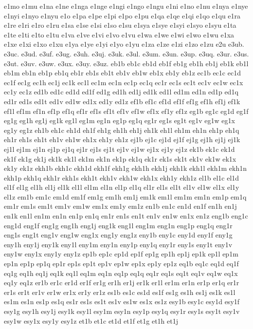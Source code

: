 {e1mo
e1mu
e1na
e1ne
e1nga
e1nge
e1ngi
e1ngo
e1ngu
e1ni
e1no
e1nu
e1nya
e1nye
e1nyi
e1nyo
e1nyu
e1o
e1pa
e1pe
e1pi
e1po
e1pu
e1qa
e1qe
e1qi
e1qo
e1qu
e1ra
e1re
e1ri
e1ro
e1ru
e1sa
e1se
e1si
e1so
e1su
e1sya
e1sye
e1syi
e1syo
e1syu
e1ta
e1te
e1ti
e1to
e1tu
e1va
e1ve
e1vi
e1vo
e1vu
e1wa
e1we
e1wi
e1wo
e1wu
e1xa
e1xe
e1xi
e1xo
e1xu
e1ya
e1ye
e1yi
e1yo
e1yu
e1za
e1ze
e1zi
e1zo
e1zu
e2u
e3ub.
e3uc.
e3ud.
e3uf.
e3ug.
e3uh.
e3uj.
e3uk.
e3ul.
e3um.
e3un.
e3up.
e3uq.
e3ur.
e3us.
e3ut.
e3uv.
e3uw.
e3ux.
e3uy.
e3uz.
eb1b
eb1c
eb1d
eb1f
eb1g
eb1h
eb1j
eb1k
eb1l
eb1m
eb1n
eb1p
eb1q
eb1r
eb1s
eb1t
eb1v
eb1w
eb1x
eb1y
eb1z
ec1b
ec1c
ec1d
ec1f
ec1g
ec1h
ec1j
ec1k
ec1l
ec1m
ec1n
ec1p
ec1q
ec1r
ec1s
ec1t
ec1v
ec1w
ec1x
ec1y
ec1z
ed1b
ed1c
ed1d
ed1f
ed1g
ed1h
ed1j
ed1k
ed1l
ed1m
ed1n
ed1p
ed1q
ed1r
ed1s
ed1t
ed1v
ed1w
ed1x
ed1y
ed1z
ef1b
ef1c
ef1d
ef1f
ef1g
ef1h
ef1j
ef1k
ef1l
ef1m
ef1n
ef1p
ef1q
ef1r
ef1s
ef1t
ef1v
ef1w
ef1x
ef1y
ef1z
eg1b
eg1c
eg1d
eg1f
eg1g
eg1h
eg1j
eg1k
eg1l
eg1m
eg1n
eg1p
eg1q
eg1r
eg1s
eg1t
eg1v
eg1w
eg1x
eg1y
eg1z
eh1b
eh1c
eh1d
eh1f
eh1g
eh1h
eh1j
eh1k
eh1l
eh1m
eh1n
eh1p
eh1q
eh1r
eh1s
eh1t
eh1v
eh1w
eh1x
eh1y
eh1z
ej1b
ej1c
ej1d
ej1f
ej1g
ej1h
ej1j
ej1k
ej1l
ej1m
ej1n
ej1p
ej1q
ej1r
ej1s
ej1t
ej1v
ej1w
ej1x
ej1y
ej1z
ek1b
ek1c
ek1d
ek1f
ek1g
ek1j
ek1k
ek1l
ek1m
ek1n
ek1p
ek1q
ek1r
ek1s
ek1t
ek1v
ek1w
ek1x
ek1y
ek1z
ekh1b
ekh1c
ekh1d
ekh1f
ekh1g
ekh1h
ekh1j
ekh1k
ekh1l
ekh1m
ekh1n
ekh1p
ekh1q
ekh1r
ekh1s
ekh1t
ekh1v
ekh1w
ekh1x
ekh1y
ekh1z
el1b
el1c
el1d
el1f
el1g
el1h
el1j
el1k
el1l
el1m
el1n
el1p
el1q
el1r
el1s
el1t
el1v
el1w
el1x
el1y
el1z
em1b
em1c
em1d
em1f
em1g
em1h
em1j
em1k
em1l
em1m
em1n
em1p
em1q
em1r
em1s
em1t
em1v
em1w
em1x
em1y
em1z
en1b
en1c
en1d
en1f
en1h
en1j
en1k
en1l
en1m
en1n
en1p
en1q
en1r
en1s
en1t
en1v
en1w
en1x
en1z
eng1b
eng1c
eng1d
eng1f
eng1g
eng1h
eng1j
eng1k
eng1l
eng1m
eng1n
eng1p
eng1q
eng1r
eng1s
eng1t
eng1v
eng1w
eng1x
eng1y
eng1z
eny1b
eny1c
eny1d
eny1f
eny1g
eny1h
eny1j
eny1k
eny1l
eny1m
eny1n
eny1p
eny1q
eny1r
eny1s
eny1t
eny1v
eny1w
eny1x
eny1y
eny1z
ep1b
ep1c
ep1d
ep1f
ep1g
ep1h
ep1j
ep1k
ep1l
ep1m
ep1n
ep1p
ep1q
ep1r
ep1s
ep1t
ep1v
ep1w
ep1x
ep1y
ep1z
eq1b
eq1c
eq1d
eq1f
eq1g
eq1h
eq1j
eq1k
eq1l
eq1m
eq1n
eq1p
eq1q
eq1r
eq1s
eq1t
eq1v
eq1w
eq1x
eq1y
eq1z
er1b
er1c
er1d
er1f
er1g
er1h
er1j
er1k
er1l
er1m
er1n
er1p
er1q
er1r
er1s
er1t
er1v
er1w
er1x
er1y
er1z
es1b
es1c
es1d
es1f
es1g
es1h
es1j
es1k
es1l
es1m
es1n
es1p
es1q
es1r
es1s
es1t
es1v
es1w
es1x
es1z
esy1b
esy1c
esy1d
esy1f
esy1g
esy1h
esy1j
esy1k
esy1l
esy1m
esy1n
esy1p
esy1q
esy1r
esy1s
esy1t
esy1v
esy1w
esy1x
esy1y
esy1z
et1b
et1c
et1d
et1f
et1g
et1h
et1j
}
